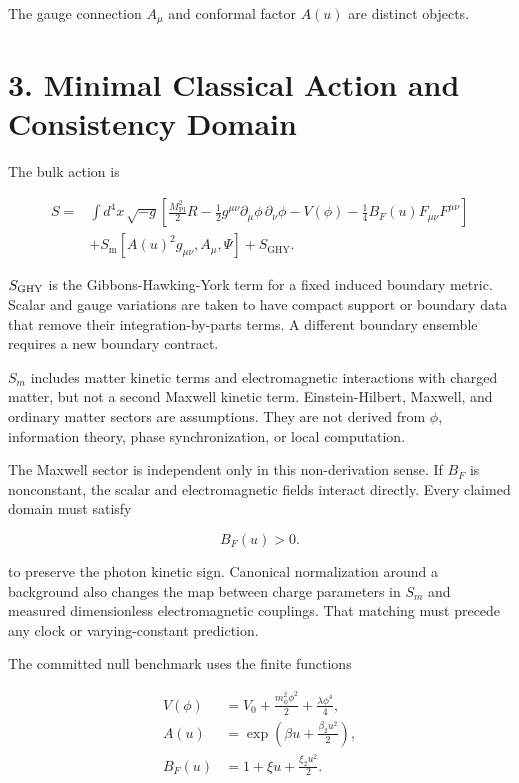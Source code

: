 \documentclass[
  american,
  11pt,
  letterpaper,
]{article}
\begin{document}
The gauge connection \(A_\mu\) and conformal factor \(A(u)\) are distinct objects.

\section{3. Minimal Classical Action and Consistency Domain}\label{minimal-classical-action-and-consistency-domain}

The bulk action is

\[
\begin{aligned}
S={}&\int d^4x\,\sqrt{-g}\left[
\frac{M_{\mathrm{Pl}}^2}{2}R
-\frac{1}{2}g^{\mu\nu}\partial_\mu\phi\,\partial_\nu\phi
-V(\phi)
-\frac{1}{4}B_F(u)F_{\mu\nu}F^{\mu\nu}
\right]\\
&+S_{\mathrm m}\!\left[A(u)^2g_{\mu\nu},A_\mu,\Psi\right]+S_{\mathrm{GHY}}.
\end{aligned}
\tag{4}
\]

\(S_{\rm GHY}\) is the Gibbons-Hawking-York term for a fixed induced boundary metric. Scalar and gauge variations are taken to have compact support or boundary data that remove their integration-by-parts terms. A different boundary ensemble requires a new boundary contract.

\(S_m\) includes matter kinetic terms and electromagnetic interactions with charged matter, but not a second Maxwell kinetic term. Einstein-Hilbert, Maxwell, and ordinary matter sectors are assumptions. They are not derived from \(\phi\), information theory, phase synchronization, or local computation.

The Maxwell sector is independent only in this non-derivation sense. If \(B_F\) is nonconstant, the scalar and electromagnetic fields interact directly. Every claimed domain must satisfy

\begin{equation}
B_F(u)>0.
\tag{5}
\end{equation}

to preserve the photon kinetic sign. Canonical normalization around a background also changes the map between charge parameters in \(S_m\) and measured dimensionless electromagnetic couplings. That matching must precede any clock or varying-constant prediction.

The committed null benchmark uses the finite functions

\[
\begin{aligned}
V(\phi)&=V_0+\frac{m_\phi^2\phi^2}{2}+\frac{\lambda\phi^4}{4},\\
A(u)&=\exp\!\left(\beta u+\frac{\beta_2u^2}{2}\right),\\
B_F(u)&=1+\xi u+\frac{\xi_2u^2}{2}.
\end{aligned}
\tag{6}
\]
\end{document}
